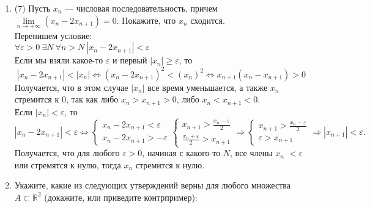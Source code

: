 \documentclass[a4paper]{article}
\def\eps{\varepsilon}
\begin{document}
\begin{enumerate}
    \item (7) Пусть $x_n$ --- числовая последовательность, причем $\lim\limits_{n\to+\infty} (x_n - 2x_{n+1}) = 0$. Покажите, что $x_n$ сходится.\\
    Перепишем условие:\\
    $\forall \eps > 0\ \exists N\ \forall n > N\ |x_n - 2x_{n+1}| < \eps$\\
    Если мы взяли какое-то $\eps$ и первый $|x_n| \ge \eps$, то $$|x_n - 2x_{n+1}| < |x_n| \Leftrightarrow 
    (x_n - 2x_{n+1})^2 < (x_n)^2 \Leftrightarrow
    x_{n+1}(x_n - x_{n+1}) > 0
    $$
    Получается, что в этом случае $|x_n|$ все время уменьшается, а также $x_n$ стремится к 0, так как либо $x_n > x_{n+1} > 0$, либо $x_n < x_{n+1} < 0$.\\
    Если $|x_n| < \eps$, то\\
    $$
    |x_n - 2x_{n+1}| < \eps \Leftrightarrow
    \begin{cases}
        x_n - 2x_{n+1} < \eps\\
        x_n - 2x_{n+1} > -\eps
    \end{cases}
    \begin{cases}
        x_{n+1} > \frac{x_n - \eps}{2}\\
        \frac{x_n + \eps}{2} > x_{n+1}
    \end{cases} \Rightarrow
    \begin{cases}
        x_{n+1} > \frac{x_n - \eps}{2}\\
        \eps > x_{n+1}
    \end{cases} \Rightarrow |x_{n+1}| < \eps.
    $$
    Получается, что для любого $\eps > 0$, начиная с какого-то $N$, все члены $x_n$ $< \eps$ или стремятся к нулю, тогда $x_n$ стремится к нулю.
    \item Укажите, какие из следующих утверждений верны для любого множества $A\subset \mathbb R^2$ (докажите, или приведите контрпример):


\end{enumerate}
\end{document}
